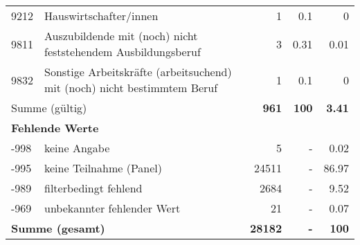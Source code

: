 \begin{longtable}{lXrrr}
        9212 & \multicolumn{1}{X}{Hauswirtschafter/innen} & %
          \num{1} &
          \num[round-mode=places,round-precision=2]{0,1} &
          \num[round-mode=places,round-precision=2]{0} \\

        9811 & \multicolumn{1}{X}{Auszubildende mit (noch) nicht feststehendem Ausbildungsberuf} & %
          \num{3} &
          \num[round-mode=places,round-precision=2]{0,31} &
          \num[round-mode=places,round-precision=2]{0,01} \\

        9832 & \multicolumn{1}{X}{Sonstige Arbeitskräfte (arbeitsuchend) mit (noch) nicht bestimmtem Beruf} & %
          \num{1} &
          \num[round-mode=places,round-precision=2]{0,1} &
          \num[round-mode=places,round-precision=2]{0} \\

     \midrule
     \multicolumn{2}{l}{Summe (gültig)} &
       \textbf{\num{961}} &
     \textbf{100} &
       \textbf{\num[round-mode=places,round-precision=2]{3,41}} \\
     \multicolumn{5}{l}{\textbf{Fehlende Werte}}\\
       -998 &
       keine Angabe &
         \num{5} &
        - &
         \num[round-mode=places,round-precision=2]{0,02} \\
       -995 &
       keine Teilnahme (Panel) &
         \num{24511} &
        - &
         \num[round-mode=places,round-precision=2]{86,97} \\
       -989 &
       filterbedingt fehlend &
         \num{2684} &
        - &
         \num[round-mode=places,round-precision=2]{9,52} \\
       -969 &
       unbekannter fehlender Wert &
         \num{21} &
        - &
         \num[round-mode=places,round-precision=2]{0,07} \\
     \midrule
     \multicolumn{2}{l}{\textbf{Summe (gesamt)}} &
          \textbf{\num{28182}} &
        \textbf{-} &
        \textbf{100} \\
     \bottomrule
     \end{longtable}
     
